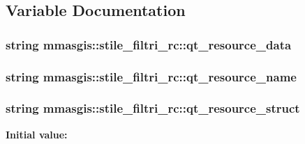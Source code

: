 \subsection{Variable Documentation}
\hypertarget{namespacemmasgis_1_1stile__filtri__rc_a994e04e2d50ff1122730ffdec0a703d9}{
\subsubsection[{qt\_\-resource\_\-data}]{\setlength{\rightskip}{0pt plus 5cm}string {\bf mmasgis::stile\_\-filtri\_\-rc::qt\_\-resource\_\-data}}}
\label{namespacemmasgis_1_1stile__filtri__rc_a994e04e2d50ff1122730ffdec0a703d9}
\hypertarget{namespacemmasgis_1_1stile__filtri__rc_a3e21c74e4c0f1a1aa531393347c175d2}{
\subsubsection[{qt\_\-resource\_\-name}]{\setlength{\rightskip}{0pt plus 5cm}string {\bf mmasgis::stile\_\-filtri\_\-rc::qt\_\-resource\_\-name}}}
\label{namespacemmasgis_1_1stile__filtri__rc_a3e21c74e4c0f1a1aa531393347c175d2}
\hypertarget{namespacemmasgis_1_1stile__filtri__rc_ae9f5cb4ad3cce2e98454f540c306b632}{
\subsubsection[{qt\_\-resource\_\-struct}]{\setlength{\rightskip}{0pt plus 5cm}string {\bf mmasgis::stile\_\-filtri\_\-rc::qt\_\-resource\_\-struct}}}
\label{namespacemmasgis_1_1stile__filtri__rc_ae9f5cb4ad3cce2e98454f540c306b632}
{\bfseries Initial value:}
